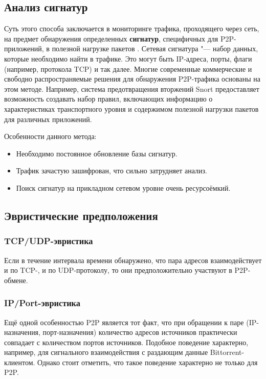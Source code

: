 \documentclass[bachelor, och, coursework]{SCWorks}
\begin{document}
\subsection{Анализ сигнатур}
Суть этого способа заключается в мониторинге трафика, проходящего через сеть, 
на предмет обнаружения определенных \textbf{сигнатур}, специфичных для P2P-приложений, в полезной нагрузке пакетов \cite{seclab}.
Сетевая сигнатура "--- набор данных, которые необходимо найти в трафике. Это могут быть IP-адреса, порты, флаги (например, протокола TCP) и так далее. Многие современные коммерческие и свободно распространяемые решения для обнаружения P2P-трафика основаны на этом методе. Например, система предотвращения вторжений Snort предоставляет возможность создавать набор правил, включающих информацию о характеристиках транспортного уровня и содержимом полезной нагрузки пакетов для различных приложений. 

Особенности данного метода:
\begin{itemize}
    \item Необходимо постоянное обновление базы сигнатур.
    \item Трафик зачастую зашифрован, что сильно затрудняет анализ.
    \item Поиск сигнатур на прикладном сетевом уровне очень ресурсоёмкий.
\end{itemize}

\subsection{Эвристические предположения}

\subsubsection{TCP/UDP-эвристика}
Если в течение интервала времени обнаружено, что пара адресов взаимодействует и по TCP-, и по UDP-протоколу, то они
предположительно участвуют в P2P-обмене.

\subsubsection{IP/Port-эвристика}
Ещё одной особенностью P2P является тот факт, что при обращении к паре (IP-назначения, порт-назначения)
количество адресов источников практически совпадает с количеством портов источников. Подобное поведение
характерно, например, для сигнального взаимодействия с раздающим данные Bittorrent-клиентом. Однако стоит отметить,
что такое поведение характерно не только для P2P.
\end{document}
